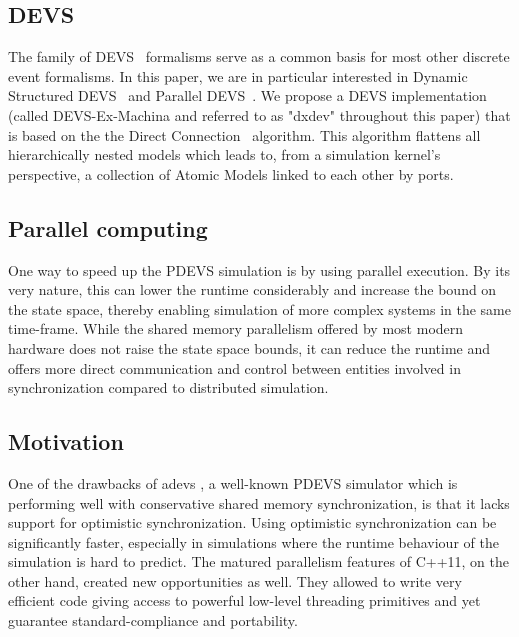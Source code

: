\subsection{DEVS}
The family of DEVS~\cite{DEVSbase} formalisms serve as a common basis for most other discrete event formalisms. In this paper, we are in particular interested in Dynamic Structured DEVS~\cite{DSDEVS} and Parallel DEVS~\cite{ParallelDEVS}.
We propose a DEVS implementation (called DEVS-Ex-Machina and referred to as "dxdev" throughout this paper) that is based on the
the Direct Connection~\cite{SymbolicFlattening} algorithm. This algorithm flattens all hierarchically nested models which leads to, from a simulation kernel's perspective, a collection of Atomic Models linked to each other by ports.

\subsection{Parallel computing}
One way to speed up the PDEVS simulation is by using parallel execution. By its very nature, this can lower the runtime considerably and increase the bound on the state space, thereby enabling simulation of more complex systems in the same time-frame.
While the shared memory parallelism offered by most modern hardware does not raise the state space bounds, it can reduce the runtime and offers more direct communication and control between entities involved in synchronization compared to distributed simulation.

\subsection{Motivation}
One of the drawbacks of adevs \cite{adevs}, a well-known PDEVS simulator which is performing well with conservative shared memory synchronization,
is that it lacks support for optimistic synchronization.
Using optimistic synchronization can be significantly faster, especially in simulations where the runtime behaviour of the simulation is hard to predict.
The matured parallelism features of C++11, on the other hand, created new opportunities as well. They allowed to write very efficient code giving access to powerful low-level threading primitives and yet guarantee standard-compliance and portability.

